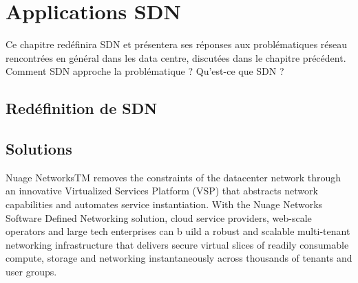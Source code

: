 
\chapter{Applications SDN}

Ce chapitre redéfinira SDN et présentera ses réponses aux problématiques réseau rencontrées en général dans les data centre, discutées dans le chapitre précédent. Comment SDN approche la problématique ? Qu'est-ce que SDN ?

\section{Redéfinition de SDN}

\section{Solutions}

Nuage NetworksTM removes the constraints of the datacenter network through an innovative Virtualized Services Platform (VSP) that abstracts network capabilities and automates service instantiation. With the Nuage Networks Software Defined Networking solution, cloud service providers, web-scale operators and large tech enterprises can b uild a robust and scalable multi-tenant networking infrastructure that delivers secure virtual slices of readily consumable compute, storage and networking instantaneously across thousands of tenants and user groups.

